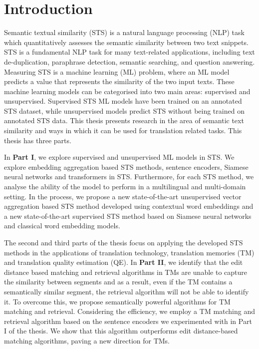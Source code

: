 \newpage
{} \label{intro}

\chapter*{Introduction}
\label{cha:introduction}


Semantic textual similarity (STS) is a natural language processing (NLP) task which quantitatively assesses the semantic similarity between two text snippets. STS is a fundamental NLP task for many text-related applications, including text de-duplication, paraphrase detection, semantic searching, and question answering. Measuring STS is a machine learning (ML) problem, where an ML model predicts a value that represents the similarity of the two input texts. These machine learning models can be categorised into two main areas: supervised and unsupervised. Supervised STS ML models have been trained on an annotated STS dataset, while unsupervised models predict STS without being trained on annotated STS data. This thesis presents research in the area of semantic text similarity and ways in which it can be used for translation related tasks. This thesis has three parts.

In \textbf{Part I}, we explore supervised and unsupervised ML models in STS. We explore embedding aggregation based STS methods, sentence encoders, Siamese neural networks and transformers in STS. Furthermore, for each STS method, we analyse the ability of the model to perform in a multilingual and multi-domain setting. In the process, we propose a new state-of-the-art unsupervised vector aggregation based STS method developed using contextual word embeddings and a new state-of-the-art supervised STS method based on Siamese neural networks and classical word embedding models. 

The second and third parts of the thesis focus on applying the developed STS methods in the applications of translation technology, translation memories (TM) and translation quality estimation (QE). In \textbf{Part II}, we identify that the edit distance based matching and retrieval algorithms in TMs are unable to capture the similarity between segments and as a result, even if the TM contains a semantically similar segment, the retrieval algorithm will not be able to identify it. To overcome this, we propose semantically powerful algorithms for TM matching and retrieval. Considering the efficiency, we employ a TM matching and retrieval algorithm based on the sentence encoders we experimented with in Part I of the thesis. We show that this algorithm outperforms edit distance-based matching algorithms, paving a new direction for TMs.


